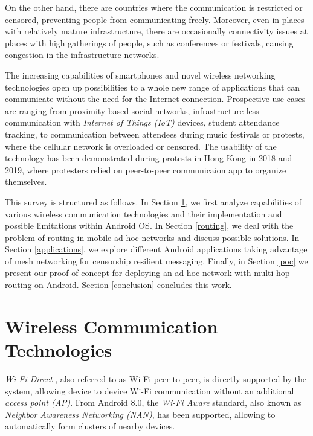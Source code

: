 \documentclass[conference,compsoc]{IEEEtran}
\begin{document}
On the other hand, there are countries where the communication is restricted or censored, preventing people from communicating freely. Moreover, even in places with relatively mature infrastructure, there are occasionally connectivity issues at places with high gatherings of people, such as conferences or festivals, causing congestion in the infrastructure networks.

The increasing capabilities of smartphones and novel wireless networking technologies open up possibilities to a whole new range of applications that can communicate without the need for the Internet connection. Prospective use cases are ranging from proximity-based social networks, infrastructure-less communication with \textit{Internet of Things (IoT)} devices, student attendance tracking, to communication between attendees during music festivals or protests, where the cellular network is overloaded or censored. The usability of the technology has been demonstrated during protests in Hong Kong in 2018 and 2019, where protesters relied on peer-to-peer communicaion app to organize themselves. \cite{forbes:hk}




This survey is structured as follows. In Section \ref{wirelesstech}, we first analyze capabilities of various wireless communication technologies and their implementation and possible limitations within Android OS. In Section \ref{routing}, we deal with the problem of routing in mobile ad hoc networks and discuss possible solutions.
In Section \ref{applications}, we explore different Android applications taking advantage of mesh networking for censorship resilient messaging. Finally, in Section \ref{poc} we present our proof of concept for deploying an ad hoc network with multi-hop routing on Android. Section \ref{conclusion} concludes this work.

\section{Wireless Communication Technologies} \label{wirelesstech}

\textit{Wi-Fi Direct} \cite{android:wifip2p}, also referred to as Wi-Fi peer to peer, is directly supported by the system, allowing device to device Wi-Fi communication without an additional \textit{access point (AP)}. From Android 8.0, the \textit{Wi-Fi Aware} \cite{android:wifiaware} standard, also known as \textit{Neighbor Awareness Networking (NAN)}, has been supported, allowing to automatically form clusters of nearby devices.
\end{document}
